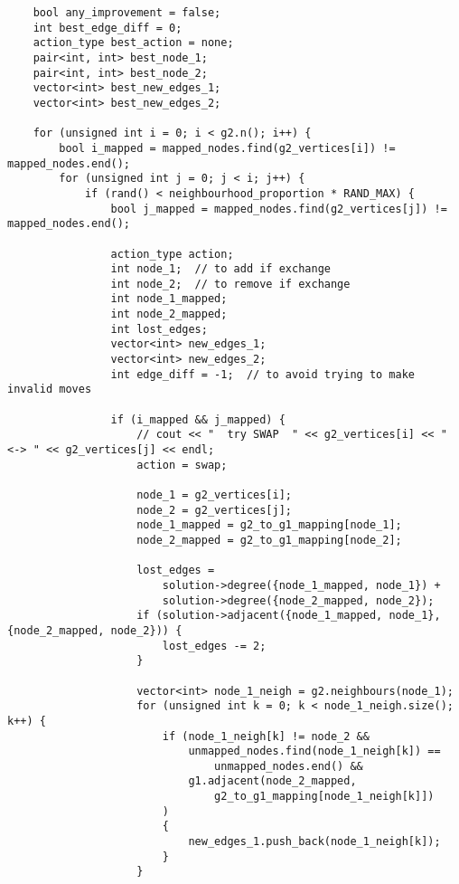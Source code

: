 \begin{lstlisting}
    bool any_improvement = false;
    int best_edge_diff = 0;
    action_type best_action = none;
    pair<int, int> best_node_1;
    pair<int, int> best_node_2;
    vector<int> best_new_edges_1;
    vector<int> best_new_edges_2;

    for (unsigned int i = 0; i < g2.n(); i++) {
        bool i_mapped = mapped_nodes.find(g2_vertices[i]) != mapped_nodes.end();
        for (unsigned int j = 0; j < i; j++) {
            if (rand() < neighbourhood_proportion * RAND_MAX) {
                bool j_mapped = mapped_nodes.find(g2_vertices[j]) != mapped_nodes.end();

                action_type action;
                int node_1;  // to add if exchange
                int node_2;  // to remove if exchange
                int node_1_mapped;
                int node_2_mapped;
                int lost_edges;
                vector<int> new_edges_1;
                vector<int> new_edges_2;
                int edge_diff = -1;  // to avoid trying to make invalid moves

                if (i_mapped && j_mapped) {
                    // cout << "  try SWAP  " << g2_vertices[i] << " <-> " << g2_vertices[j] << endl;
                    action = swap;

                    node_1 = g2_vertices[i];
                    node_2 = g2_vertices[j];
                    node_1_mapped = g2_to_g1_mapping[node_1];
                    node_2_mapped = g2_to_g1_mapping[node_2];

                    lost_edges =
                        solution->degree({node_1_mapped, node_1}) +
                        solution->degree({node_2_mapped, node_2});
                    if (solution->adjacent({node_1_mapped, node_1}, {node_2_mapped, node_2})) {
                        lost_edges -= 2;
                    }

                    vector<int> node_1_neigh = g2.neighbours(node_1);
                    for (unsigned int k = 0; k < node_1_neigh.size(); k++) {
                        if (node_1_neigh[k] != node_2 &&
                            unmapped_nodes.find(node_1_neigh[k]) ==
                                unmapped_nodes.end() &&
                            g1.adjacent(node_2_mapped,
                                g2_to_g1_mapping[node_1_neigh[k]])
                        )
                        {
                            new_edges_1.push_back(node_1_neigh[k]);
                        }
                    }


\end{lstlisting}

